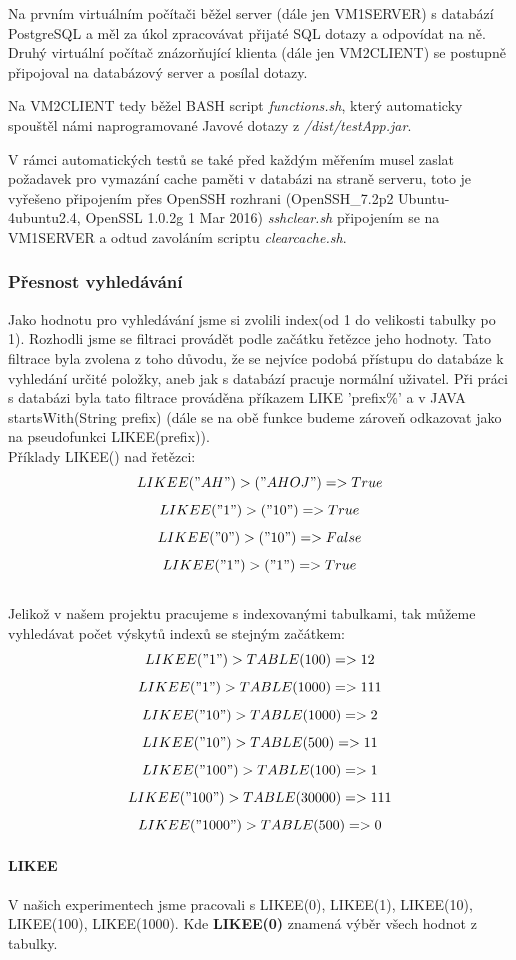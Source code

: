 \documentclass[a4paper, 11pt]{article}
\begin{document}
Na prvním virtuálním počítači běžel server (dále jen VM1SERVER) s databází PostgreSQL a měl za úkol zpracovávat přijaté SQL dotazy a odpovídat na ně.
Druhý virtuální počítač znázorňující klienta (dále jen VM2CLIENT) se postupně připojoval na databázový server a posílal dotazy. 

Na VM2CLIENT tedy běžel BASH \cite{bash_web} script \textit{functions.sh}, který automaticky spouštěl námi naprogramované Javové dotazy z \textit{/dist/testApp.jar}.

V rámci automatických testů se také před každým měřením musel zaslat požadavek pro vymazání cache paměti v databázi na straně serveru, toto je vyřešeno připojením přes OpenSSH rozhrani (OpenSSH\_7.2p2 Ubuntu-4ubuntu2.4, OpenSSL 1.0.2g  1 Mar 2016) \cite{openssh} \textit{sshclear.sh} připojením se na VM1SERVER a odtud zavoláním scriptu \textit{clearcache.sh}.

\subsubsection{Přesnost vyhledávání}

Jako hodnotu pro vyhledávání jsme si zvolili index(od 1 do velikosti tabulky po 1). Rozhodli jsme se filtraci provádět podle začátku řetězce jeho hodnoty. Tato filtrace byla zvolena z toho důvodu, že se nejvíce podobá přístupu do databáze k vyhledání určité položky, aneb jak s databází pracuje normální uživatel. Při práci s databázi byla tato filtrace prováděna příkazem LIKE 'prefix\%' \cite{sqllike} a v JAVA startsWith(String prefix) \cite{javalike} (dále se na obě funkce budeme zároveň odkazovat jako na pseudofunkci LIKEE(prefix)).
\\
Příklady LIKEE() nad řetězci:
$$LIKEE("AH") > ("AHOJ") => True$$
$$LIKEE("1") > ("10") => True$$
$$LIKEE("0") > ("10") => False$$
$$LIKEE("1") > ("1") => True$$
\\
Jelikož v našem projektu pracujeme s indexovanými tabulkami, tak můžeme vyhledávat počet výskytů indexů se stejným začátkem:
$$LIKEE("1") > TABLE(100) => 12$$
$$LIKEE("1") > TABLE(1000) => 111$$
$$LIKEE("10") > TABLE(1000) => 2$$
$$LIKEE("10") > TABLE(500)=> 11$$
$$LIKEE("100") > TABLE(100)=> 1$$
$$LIKEE("100") > TABLE(30000) => 111$$
$$LIKEE("1000") > TABLE(500) => 0$$

\paragraph{LIKEE} \label{sec:likee}
V našich experimentech jsme pracovali s LIKEE(0), LIKEE(1), LIKEE(10), LIKEE(100), LIKEE(1000). Kde \textbf{LIKEE(0)} znamená výběr všech hodnot z tabulky.
\end{document}
